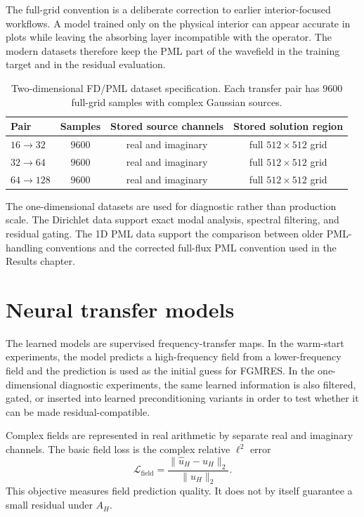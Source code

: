 The full-grid convention is a deliberate correction to earlier
interior-focused workflows. A model trained only on the physical interior can
appear accurate in plots while leaving the absorbing layer incompatible with
the operator. The modern datasets therefore keep the PML part of the
wavefield in the training target and in the residual evaluation.

\begin{table}[htbp]
\centering
\caption{Two-dimensional FD/PML dataset specification. Each transfer pair has
$9600$ full-grid samples with complex Gaussian sources.}
\label{tab:setup-2d-datasets}
\begin{tabular}{lccc}
\toprule
Pair & Samples & Stored source channels & Stored solution region \\
\midrule
$16\to32$ & $9600$ & real and imaginary & full $512\times512$ grid \\
$32\to64$ & $9600$ & real and imaginary & full $512\times512$ grid \\
$64\to128$ & $9600$ & real and imaginary & full $512\times512$ grid \\
\bottomrule
\end{tabular}
\end{table}

The one-dimensional datasets are used for diagnostic rather than production
scale. The Dirichlet data support exact modal analysis, spectral filtering,
and residual gating. The 1D PML data support the comparison between older
PML-handling conventions and the corrected full-flux PML convention used in
the Results chapter.

\section{Neural transfer models}
\label{sec:setup-neural-models}

The learned models are supervised frequency-transfer maps. In the warm-start
experiments, the model predicts a high-frequency field from a lower-frequency
field and the prediction is used as the initial guess for FGMRES. In the
one-dimensional diagnostic experiments, the same learned information is also
filtered, gated, or inserted into learned preconditioning variants in order to
test whether it can be made residual-compatible.

Complex fields are represented in real arithmetic by separate real and
imaginary channels. The basic field loss is the complex relative $\ell^2$
error
\begin{equation}
    \mathcal{L}_{\mathrm{field}}
    =
    \frac{\|\hat{u}_H-u_H\|_2}{\|u_H\|_2}.
    \label{eq:setup-field-loss}
\end{equation}
This objective measures field prediction quality. It does not by itself
guarantee a small residual under $A_H$.

